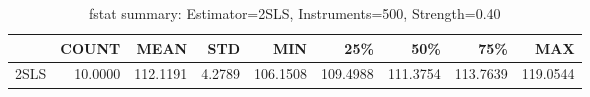 \begin{table}[ht]
\centering
\caption{fstat summary: Estimator=2SLS, Instruments=500, Strength=0.40}
\begin{tabular}{lrrrrrrrr}
\toprule
 & COUNT & MEAN & STD & MIN & 25\% & 50\% & 75\% & MAX \\
\midrule
2SLS & 10.0000 & 112.1191 & 4.2789 & 106.1508 & 109.4988 & 111.3754 & 113.7639 & 119.0544 \\
\bottomrule
\end{tabular}
\end{table}
